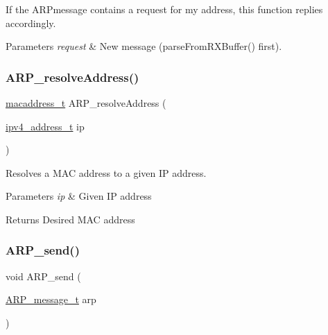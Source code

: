 If the A\+R\+Pmessage contains a request for my address, this function replies accordingly. 


\begin{DoxyParams}{Parameters}
{\em request} & New message (parse\+From\+R\+X\+Buffer() first). \\
\hline
\end{DoxyParams}
\mbox{\label{group__arp_ga050b0c9b4cc725837f257ab6f576df31}} 
\subsubsection{\texorpdfstring{ARP\_resolveAddress()}{ARP\_resolveAddress()}}
{\footnotesize\ttfamily \mbox{\hyperlink{group__ethernet_gacb865bcbf50a6c8cef05581bfabff373}{macaddress\+\_\+t}} A\+R\+P\+\_\+resolve\+Address (\begin{DoxyParamCaption}\item[{\mbox{\hyperlink{group__ipv4_gad9df0882950e70d0587a4b423beb261a}{ipv4\+\_\+address\+\_\+t}}}]{ip }\end{DoxyParamCaption})}



Resolves a M\+AC address to a given IP address. 


\begin{DoxyParams}{Parameters}
{\em ip} & Given IP address \\
\hline
\end{DoxyParams}
\begin{DoxyReturn}{Returns}
Desired M\+AC address 
\end{DoxyReturn}
\mbox{\label{group__arp_gabce5812c383f7e08c3a83c6db7f2f029}} 
\subsubsection{\texorpdfstring{ARP\_send()}{ARP\_send()}}
{\footnotesize\ttfamily void A\+R\+P\+\_\+send (\begin{DoxyParamCaption}\item[{\mbox{\hyperlink{group__arp_ga1708785291f10e8cc257efe2b769ba4c}{A\+R\+P\+\_\+message\+\_\+t}}}]{arp }\end{DoxyParamCaption})}



